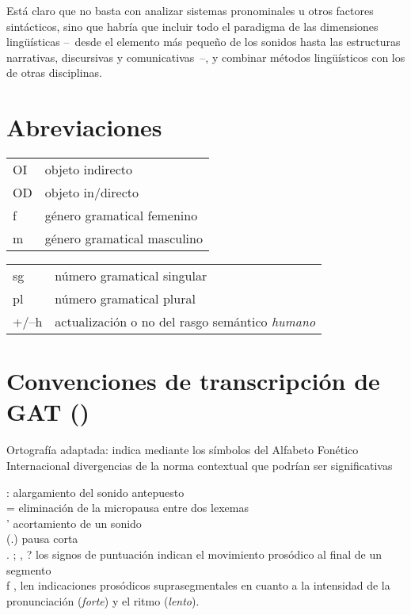 \documentclass[output=paper]{../langscibook}
\begin{document}
Está claro que no basta con analizar sistemas pronominales u otros factores sintácticos, sino que habría que incluir todo el paradigma de las dimensiones lingüísticas – desde el elemento más pequeño de los sonidos hasta las estructuras narrativas, discursivas y comunicativas –, y combinar métodos lingüísticos con los de otras disciplinas.

\section*{Abreviaciones}
\begin{tabularx}{.475\textwidth}{@{}ll}
OI& objeto indirecto\\
OD& objeto in/directo\\
f &género gramatical femenino\\
m & género gramatical masculino\\
\end{tabularx}
\begin{tabularx}{.475\textwidth}{lQ}
sg& número gramatical singular\\
pl& número gramatical plural\\
+/–h& actualización o no del rasgo semántico \textit{humano}\\
\end{tabularx}

\section*{Convenciones de transcripción de GAT (\citealt{SeltingEtAl1998})}

Ortografía adaptada: indica mediante los símbolos del Alfabeto Fonético Internacional divergencias de la norma contextual que podrían ser significativas

\noindent
: alargamiento del sonido antepuesto\\
= eliminación de la micropausa entre dos lexemas\\
’ acortamiento de un sonido\\
(.) pausa corta\\
. ; , ? los signos de puntuación indican el movimiento prosódico al final de un segmento\\
{\textrangle}{\textrangle}f{\textlangle}  {\textlangle}, {\textrangle}{\textrangle}len{\textlangle}  {\textlangle} indicaciones prosódicos suprasegmentales en cuanto a la intensidad de la pronunciación (\textit{forte}) y el ritmo (\textit{lento}).\\
 \sloppy\printbibliography[heading=subbibliography,notkeyword=this]
\end{document}
